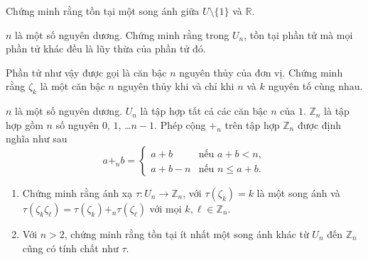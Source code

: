 \begin{exercise}
    Chứng minh rằng tồn tại một song ánh giữa $U\setminus\{ 1 \}$ và $\mathbb{R}$.
\end{exercise}

\begin{exercise}
	$n$ là một số nguyên dương. Chứng minh rằng trong $U_{n}$, tồn tại phần tử mà mọi phần tử khác đều là lũy thừa của phần tử đó.

	Phần tử như vậy được gọi là căn bậc $n$ nguyên thủy của đơn vị. Chứng minh rằng $\zeta_{k}$ là một căn bậc $n$ nguyên thủy khi và chỉ khi $n$ và $k$ nguyên tố cùng nhau.
\end{exercise}

\begin{exercise}
    $n$ là một số nguyên dương. $U_{n}$ là tập hợp tất cả các căn bậc $n$ của $1$. $\mathbb{Z}_{n}$ là tập hợp gồm $n$ số nguyên $0$, $1$, \ldots $n-1$. Phép cộng $+_{n}$ trên tập hợp $\mathbb{Z}_{n}$ được định nghĩa như sau
	\[
		a +_{n} b = \begin{cases}
			a + b     & \text{nếu $a + b < n$},   \\
			a + b - n & \text{nếu $n\leq a + b$}.
		\end{cases}
	\]

    \begin{enumerate}[label={(\roman*)}]
        \item Chứng minh rằng ánh xạ $\tau: U_{n}\to \mathbb{Z}_{n}$, với $\tau(\zeta_{k}) = k$ là một song ánh và $\tau(\zeta_{k}\zeta_{\ell}) = \tau(\zeta_{k}) +_{n} \tau(\zeta_{\ell})$ với mọi $k, \ell\in \mathbb{Z}_{n}$.
        \item Với $n > 2$, chứng minh rằng tồn tại ít nhất một song ánh khác từ $U_{n}$ đến $\mathbb{Z}_{n}$ cũng có tính chất như $\tau$.
    \end{enumerate}
\end{exercise}

